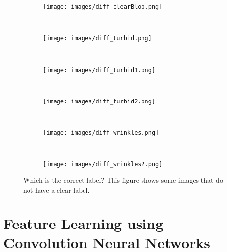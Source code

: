 \documentclass[review,12pt,3p]{elsarticle}
\begin{document}
\begin{figure}[!t]
        \centering
        \begin{subfigure}[b]{0.065\textwidth}
                \texttt{[image: images/diff\_clearBlob.png]}
                \caption{}\label{fig:example_1}
        \end{subfigure}%
        ~ %
        \begin{subfigure}[b]{0.065\textwidth}
                \texttt{[image: images/diff\_turbid.png]}
                \caption{}\label{fig:example_2}
        \end{subfigure}
        ~ %
        \begin{subfigure}[b]{0.065\textwidth}
                \texttt{[image: images/diff\_turbid1.png]}
                \caption{}\label{fig:example_3}
        \end{subfigure}
        ~
        \begin{subfigure}[b]{0.065\textwidth}
                \texttt{[image: images/diff\_turbid2.png]}
                \caption{}\label{fig:example_4}
        \end{subfigure}%
        ~
        \begin{subfigure}[b]{0.065\textwidth}
                \texttt{[image: images/diff\_wrinkles.png]}
                \caption{}\label{fig:example_5}
        \end{subfigure}
        ~
        \begin{subfigure}[b]{0.065\textwidth}
                \texttt{[image: images/diff\_wrinkles2.png]}
                \caption{}\label{fig:example_6}
        \end{subfigure}

        \caption{Which is the correct label? This figure shows some images that do not have a clear label.}
        \label{fig:difficultImages}
\end{figure}






\section{Feature Learning using Convolution Neural Networks}
\label{secMethodology}
\end{document}
